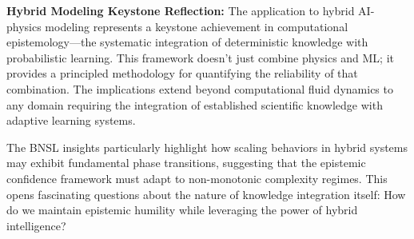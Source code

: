 \begin{reflectionbox}
\textbf{Hybrid Modeling Keystone Reflection:} The application to hybrid AI-physics modeling represents a keystone achievement in computational epistemology—the systematic integration of deterministic knowledge with probabilistic learning. This framework doesn't just combine physics and ML; it provides a principled methodology for quantifying the reliability of that combination. The implications extend beyond computational fluid dynamics to any domain requiring the integration of established scientific knowledge with adaptive learning systems.

The BNSL insights particularly highlight how scaling behaviors in hybrid systems may exhibit fundamental phase transitions, suggesting that the epistemic confidence framework must adapt to non-monotonic complexity regimes. This opens fascinating questions about the nature of knowledge integration itself: How do we maintain epistemic humility while leveraging the power of hybrid intelligence?
\end{reflectionbox}